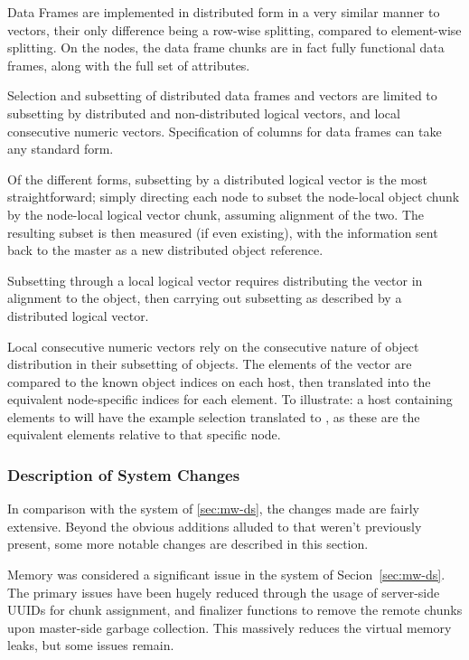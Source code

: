 Data Frames are implemented in distributed form in a very similar manner to vectors, their only difference being a row-wise splitting, compared to element-wise splitting.
On the nodes, the data frame chunks are in fact fully functional data frames, along with the full set of attributes.

Selection and subsetting of distributed data frames and vectors are limited to subsetting by distributed and non-distributed logical vectors, and local consecutive numeric vectors.
Specification of columns for data frames can take any standard form.

Of the different forms, subsetting by a distributed logical vector is the most straightforward; simply directing each node to subset the node-local object chunk by the node-local logical vector chunk, assuming alignment of the two.
The resulting subset is then measured (if even existing), with the information sent back to the master as a new distributed object reference.

Subsetting through a local logical vector requires distributing the vector in alignment to the object, then carrying out subsetting as described by a distributed logical vector.

Local consecutive numeric vectors rely on the consecutive nature of object distribution in their subsetting of objects.
The elements of the vector are compared to the known object indices on each host, then translated into the equivalent node-specific indices for each element.
To illustrate: a host containing elements  to  will have the example selection  translated to , as these are the equivalent elements relative to that specific node.

\subsubsection{Description of System Changes}\label{sec:description-of-system-changes}

In comparison with the system of \cref{sec:mw-ds}, the changes made are fairly extensive.
Beyond the obvious additions alluded to that weren't previously present, some more notable changes are described in this section.

Memory was considered a significant issue in the system of Secion~\ref{sec:mw-ds}.
The primary issues have been hugely reduced through the usage of server-side UUIDs for chunk assignment, and finalizer functions to remove the remote chunks upon master-side garbage collection.
This massively reduces the virtual memory leaks, but some issues remain.

